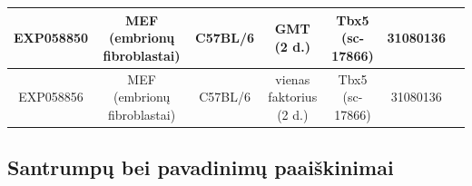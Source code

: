 \documentclass[12pt]{article}
\begin{document}
\begin{table}[htb]
\begin{tabular}{|c|c|c|c|c|c|c|}
    \hline
    EXP058850 & \thead{MEF\\ (embrionų fibroblastai)} &
                C57BL/6 & GMT (2 d.) &
                \thead{Tbx5\\ (sc-17866)} & 31080136\\
    \hline
    EXP058856 & \thead{MEF\\ (embrionų fibroblastai)} & 
                C57BL/6 & \thead{vienas\\ faktorius (2 d.)} &
                \thead{Tbx5\\ (sc-17866)} & 31080136\\
    \hline
    \end{tabular}
\end{table}
\newpage

\subsection{Santrumpų bei pavadinimų paaiškinimai}
\end{document}
